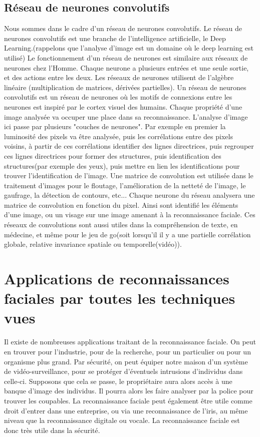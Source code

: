 \documentclass[12pt,french]{article}
\theoremstyle{plain}
\theoremstyle{definition}
\begin{document}
\subsection{Réseau de neurones convolutifs}
Nous sommes dans le cadre d'un réseau de neurones convolutifs. Le réseau de neurones convolutifs est une branche de l'intelligence artificielle, le Deep Learning.(rappelons que l'analyse d'image est un domaine où le deep learning est utilisé) Le fonctionnement d'un réseau de neurones est similaire aux réseaux de neurones chez l'Homme. Chaque neurone a plusieurs entrées et une seule sortie, et des actions entre les deux. Les réseaux de neurones utilisent de l'algèbre linéaire (multiplication de matrices, dérivées partielles). Un réseau de neurones convolutifs est un réseau de neurones où les motifs de connexions entre les neurones est inspiré par le cortex visuel des humains. Chaque propriété d'une image analysée va occuper une place dans sa reconnaissance. L'analyse d'image ici passe par plusieurs "couches de neurones". Par exemple en premier la luminosité des pixels va être analysée, puis les corrélations entre des pixels voisins, à partir de ces corrélations identifier des lignes directrices, puis regrouper ces lignes directrices pour former des structures, puis identification des structures(par exemple des yeux), puis mettre en lien les identifications pour trouver l'identification de l'image.
Une matrice de convolution est utilisée dans le traitement d'images pour le floutage, l'amélioration de la netteté de l'image, le gaufrage, la détection de contours, etc...
Chaque neurone du réseau analysera une matrice de convolution en fonction du pixel.
Ainsi sont identifié les éléments d'une image, ou un visage sur une image amenant à la reconnaissance faciale.
Ces réseaux de convolutions sont aussi utiles dans la compréhension de texte, en médecine, et même pour le jeu de go(soit lorsqu'il il y a une partielle corrélation globale, relative invariance spatiale ou temporelle(vidéo)).

\newpage
\section{Applications de reconnaissances faciales par toutes les techniques vues}
Il existe de nombreuses applications traitant de la reconnaissance faciale. On peut en trouver pour l'industrie, pour de la recherche, pour un particulier ou pour un organisme plus grand.
Par sécurité, on peut équiper notre maison d'un système de vidéo-surveillance, pour se protéger d'éventuels intrusions d'individus dans celle-ci.
Supposons que cela se passe, le propriétaire aura alors accès à une banque d'image des individus. Il pourra alors les faire analyser par la police pour trouver les coupables.
La reconnaissance faciale peut également être utile comme droit d'entrer dans une entreprise, ou via une reconnaissance de l'iris, au même niveau que la reconnaissance digitale ou vocale.
La reconnaissance faciale est donc très utile dans la sécurité.
\end{document}
